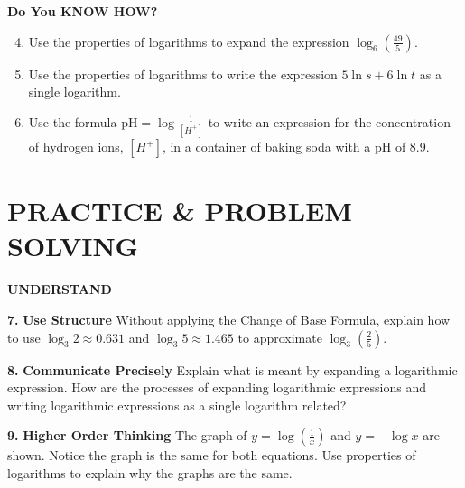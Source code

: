 \documentclass{article}
\newenvironment{practice}[2]{\textbf{#1.}}{}
\newcommand{\answer}[1]{}
\begin{document}
\textbf{Do You KNOW HOW?}
\begin{enumerate}
    \setcounter{enumi}{3}
    \item Use the properties of logarithms to expand the expression $\log_6\left(\frac{49}{5}\right)$.
    \item Use the properties of logarithms to write the expression $5\ln s + 6\ln t$ as a single logarithm.
    \item Use the formula $\text{pH} = \log\frac{1}{[H^+]}$ to write an expression for the concentration of hydrogen ions, $[H^+]$, in a container of baking soda with a pH of 8.9.
\end{enumerate}


\section*{PRACTICE \& PROBLEM SOLVING}

\textbf{UNDERSTAND}

\begin{practice}{7}{}
\textbf{Use Structure} Without applying the Change of Base Formula, explain how to use $\log_3 2 \approx 0.631$ and $\log_3 5 \approx 1.465$ to approximate $\log_3\left(\frac{2}{5}\right)$.
\answer{$\log_3\left(\frac{2}{5}\right) = \log_3 2 - \log_3 5 \approx 0.631 - 1.465 = -0.834$}
\end{practice}

\begin{practice}{8}{}
\textbf{Communicate Precisely} Explain what is meant by expanding a logarithmic expression. How are the processes of expanding logarithmic expressions and writing logarithmic expressions as a single logarithm related?
\answer{They are inverse processes using the same properties in reverse directions.}
\end{practice}

\begin{practice}{9}{}
\textbf{Higher Order Thinking} The graph of $y = \log\left(\frac{1}{x}\right)$ and $y = -\log x$ are shown. Notice the graph is the same for both equations. Use properties of logarithms to explain why the graphs are the same.

\begin{center}
\end{center}
\answer{$\log\left(\frac{1}{x}\right) = \log(x^{-1}) = -1 \log(x) = -\log x$}
\end{practice}
\end{document}
